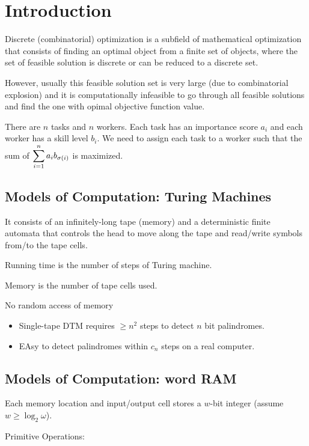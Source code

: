 \section{Introduction}
Discrete (combinatorial) optimization is a subfield of mathematical optimization that consists of finding an optimal object from a finite set of objects, where the set of feasible solution is discrete or can be reduced to a discrete set.

However, usually this feasible solution set is very large (due to combinatorial explosion) and it is computationally infeasible to go through all feasible solutions and find the  one with opimal objective function value.

\begin{example}
    There are  $ n  $ tasks and  $ n $ workers. Each task has an importance score  $ a_i $ and each worker has a skill level  $ b_i $. We need to assign each task to a worker such that the sum of  $ \displaystyle\sum_{i=1}^n a_ib_{\sigma(i)}$  is maximized.  
\end{example}
\subsection{Models of Computation: Turing Machines}
\begin{definition}
    It consists of an infinitely-long tape (memory) and a deterministic finite automata that controls the head to move along the tape and read/write symbols from/to the tape cells.
\end{definition}
\begin{definition}
    Running time is the number of steps of Turing machine.

    Memory is the number of tape cells used.
\end{definition}

\begin{definition}[Caveat]
    No random access of memory 
    \begin{itemize}
        \item Single-tape DTM requires  $ \geq n^2 $ steps to detect  $ n $ bit palindromes.
        \item EAsy to detect palindromes within  $ c_n $ steps on a real computer.  
    \end{itemize}
\end{definition}
\subsection{Models of Computation: word RAM}
\begin{definition}
    Each memory location and input/output cell stores a  $ w $-bit integer (assume  $ w \geq \log_2\omega $).

    Primitive Operations:
\end{definition}

